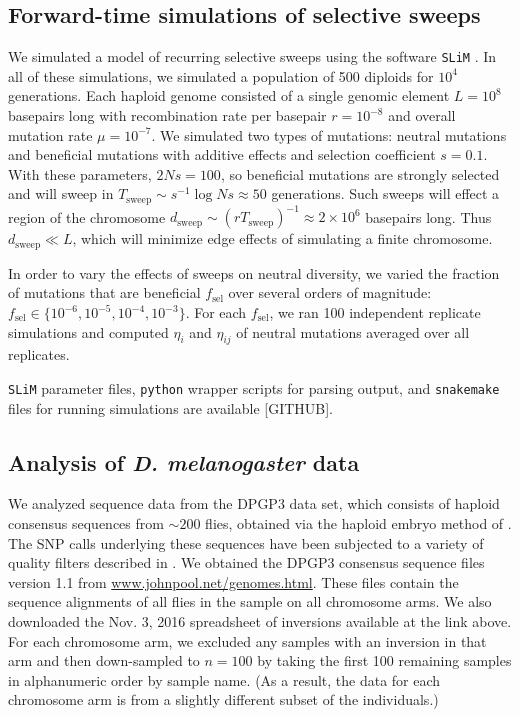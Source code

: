\documentclass[11pt, letterpaper]{article}   	%
\begin{document}
\subsection*{Forward-time simulations of selective sweeps}

We simulated a model of recurring selective sweeps using the software \texttt{SLiM} \autocite{MesserEtAl201?}.
In all of these simulations, we simulated a population of 500 diploids for $10^4$ generations.
Each haploid genome consisted of a single genomic element $L=10^8$ basepairs long with recombination rate per basepair $r = 10^{-8}$ and overall mutation rate $\mu = 10^{-7}$.
We simulated two types of mutations: neutral mutations and beneficial mutations with additive effects and selection coefficient $s=0.1$.
With these parameters, $2Ns = 100$, so beneficial mutations are strongly selected and will sweep in $T_{\text{sweep}}\sim s^{-1} \log Ns \approx 50$ generations.
Such sweeps will effect a region of the chromosome $d_{\text{sweep}} \sim (r T_{\text{sweep}})^{-1} \approx 2 \times 10^6$ basepairs long.
Thus $d_{\text{sweep}} \ll L$, which will minimize edge effects of simulating a finite chromosome.

In order to vary the effects of sweeps on neutral diversity, we varied the fraction of mutations that are beneficial $f_{\text{sel}}$ over several orders of magnitude: $f_{\text{sel}} \in \{10^{-6}, 10^{-5}, 10^{-4}, 10^{-3}\}$.
For each $f_{\text{sel}}$, we ran 100 independent replicate simulations and computed $\eta_i$ and $\eta_{ij}$ of neutral mutations averaged over all replicates.

\texttt{SLiM} parameter files, \texttt{python} wrapper scripts for parsing output, and \texttt{snakemake} files for running simulations are available [GITHUB].

\subsection*{Analysis of \textit{D. melanogaster} data}

We analyzed sequence data from the DPGP3 data set, which consists of haploid consensus sequences from $\sim 200$ flies, obtained via the haploid embryo method of \cite{LangleyEtal2011}.
The SNP calls underlying these sequences have been subjected to a variety of quality filters described in \cite{LackEtAl2015}.
We obtained the DPGP3 consensus sequence files version 1.1 from \url{www.johnpool.net/genomes.html}.
These files contain the sequence alignments of all flies in the sample on all chromosome arms.
We also downloaded the Nov. 3, 2016 spreadsheet of inversions available at the link above.
For each chromosome arm, we excluded any samples with an inversion in that arm and then down-sampled to $n=100$ by taking the first 100 remaining samples in alphanumeric order by sample name.
(As a result, the data for each chromosome arm is from a slightly different subset of the individuals.)
\end{document}
